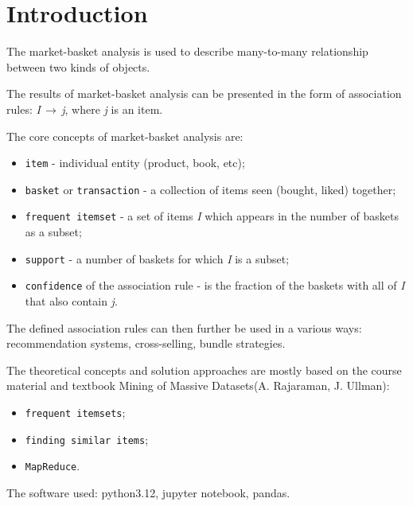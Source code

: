 % 
% 
\chapter{Introduction}
\label{chap:introduction}


The market-basket analysis is used to describe many-to-many relationship between two kinds of objects.

The results of market-basket analysis can be presented in the form of association rules: \textit{I}$\,\to\,$\textit{j}, where \textit{j} is an item.

The core concepts of market-basket analysis are:
\begin{itemize}
	\item \texttt{item} - individual entity (product, book, etc); 
	\item \texttt{basket} or \texttt{transaction} - a collection of items seen (bought, liked) together;  
	\item \texttt{frequent itemset} - a set of items \textit{I} which appears in the number of baskets as a subset;
	\item \texttt{support} - a number of baskets for which \textit{I} is a subset;
	\item \texttt{confidence} of the association rule - is the fraction of the baskets with all of \textit{I} that also contain \textit{j}.
\end{itemize}

The defined association rules can then further be used in a various ways: recommendation systems, cross-selling, bundle strategies.

The theoretical concepts and solution approaches are mostly based on the course material and textbook Mining of Massive Datasets(A. Rajaraman, J. Ullman):
\begin{itemize}
	\item \texttt{frequent itemsets};
	\item \texttt{finding similar items};
	\item \texttt{MapReduce}.
\end{itemize}

The software used: python3.12, jupyter notebook, pandas.

